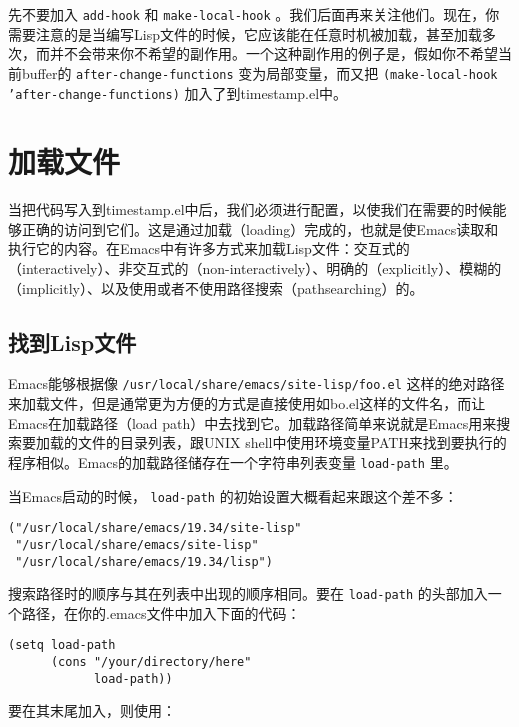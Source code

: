 先不要加入 \texttt{add-hook} 和 \texttt{make-local-hook} 。我们后面再来关注他们。现在，你需要注意的是当编写Lisp文件的时候，它应该能在任意时机被加载，甚至加载多次，而并不会带来你不希望的副作用。一个这种副作用的例子是，假如你不希望当前buffer的 \texttt{after-change-functions} 变为局部变量，而又把 \texttt{(make-local-hook 'after-change-functions)} 加入了到timestamp.el中。

\section{加载文件}
\label{section:05-Loading-the-File}

当把代码写入到timestamp.el中后，我们必须进行配置，以使我们在需要的时候能够正确的访问到它们。这是通过加载（loading）完成的，也就是使Emacs读取和执行它的内容。在Emacs中有许多方式来加载Lisp文件：交互式的（interactively）、非交互式的（non-interactively）、明确的（explicitly）、模糊的（implicitly）、以及使用或者不使用路径搜索（pathsearching）的。

\subsection{找到Lisp文件}
\label{section:05-Finding-Lisp-Files}

Emacs能够根据像 \verb|/usr/local/share/emacs/site-lisp/foo.el| 这样的绝对路径来加载文件，但是通常更为方便的方式是直接使用如bo.el这样的文件名，而让Emacs在加载路径（load path）中去找到它。加载路径简单来说就是Emacs用来搜索要加载的文件的目录列表，跟UNIX shell中使用环境变量PATH来找到要执行的程序相似。Emacs的加载路径储存在一个字符串列表变量 \texttt{load-path} 里。

当Emacs启动的时候， \texttt{load-path} 的初始设置大概看起来跟这个差不多：

\begin{verbatim}
("/usr/local/share/emacs/19.34/site-lisp"
 "/usr/local/share/emacs/site-lisp"
 "/usr/local/share/emacs/19.34/lisp")
\end{verbatim}

搜索路径时的顺序与其在列表中出现的顺序相同。要在 \texttt{load-path} 的头部加入一个路径，在你的.emacs文件中加入下面的代码：

\begin{verbatim}
(setq load-path
      (cons "/your/directory/here"
            load-path))
\end{verbatim}

要在其末尾加入，则使用：

